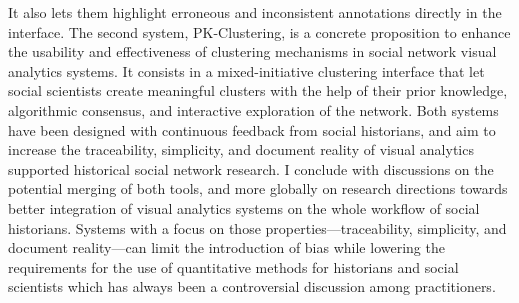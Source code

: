 {{It also lets them highlight erroneous and inconsistent annotations directly in the interface.
The second system, PK-Clustering, is a concrete proposition to enhance the usability and effectiveness of clustering mechanisms in social network visual analytics systems. It consists in a mixed-initiative clustering interface that let social scientists create meaningful clusters with the help of their prior knowledge, algorithmic consensus, and interactive exploration of the network.
Both systems have been designed with continuous feedback from social historians, and aim to increase the traceability, simplicity, and document reality of
visual analytics supported historical social network research.
I conclude with discussions on the potential merging of both tools, and more globally on research directions towards better integration of visual analytics systems on the whole workflow of social historians.
Systems with a focus on those properties---traceability, simplicity, and document reality---can limit the introduction of bias while lowering the requirements for the use of quantitative methods for historians and social scientists which has always been a controversial discussion among practitioners.}

}
